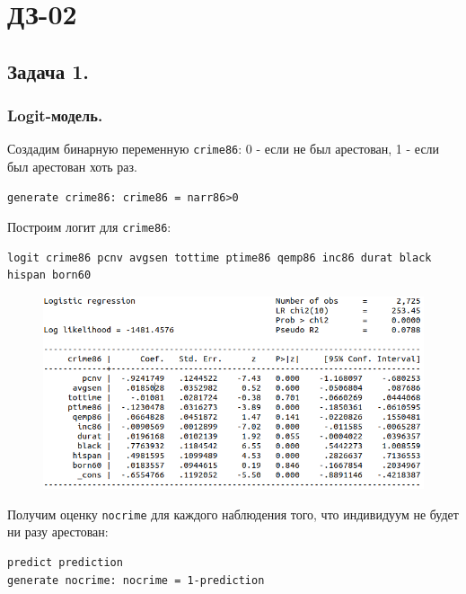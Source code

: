 \documentclass[12pt,a4paper, oneside]{extreport}
\begin{document}



\chapter{ДЗ-02}


\section{Задача 1.}


\subsection{Logit-модель.}

Создадим бинарную переменную \texttt{crime86}: 0 - если не был арестован,  1 - если был арестован хоть раз. 

\begin{verbatim}
generate crime86: crime86 = narr86>0
\end{verbatim}

Построим логит для \texttt{crime86}: 

\begin{verbatim}
logit crime86 pcnv avgsen tottime ptime86 qemp86 inc86 durat black hispan born60
\end{verbatim}

\begin{figure}[htb]
	\centering
	\includegraphics[width=1\linewidth]{screenshot001}
	\label{fig:screenshot001}
\end{figure}

Получим оценку \texttt{nocrime} для каждого наблюдения того, что индивидуум не будет ни разу арестован: 

\begin{verbatim}
predict prediction
generate nocrime: nocrime = 1-prediction
\end{verbatim}
\end{document}
